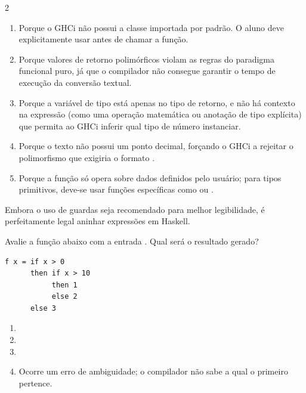 \documentclass[a4paper,10pt,brazil]{article}
\begin{document}
\begin{multicols}{2}
\begin{enumerate}
  \item Porque o GHCi não possui a classe  importada por padrão. O aluno deve explicitamente usar  antes de chamar a função.

  \item Porque valores de retorno polimórficos violam as regras do paradigma funcional puro, já que o compilador não consegue garantir o tempo de execução da conversão textual.

  \item Porque a variável de tipo  está apenas no tipo de retorno, e não há contexto na expressão (como uma operação matemática ou anotação de tipo explícita) que permita ao GHCi inferir qual tipo de número instanciar.

  \item Porque o texto  não possui um ponto decimal, forçando o GHCi a rejeitar o polimorfismo que exigiria o formato .

  \item Porque a função  só opera sobre dados definidos pelo usuário; para tipos primitivos, deve-se usar funções específicas como  ou .


\end{enumerate}

Embora o uso de guardas seja recomendado para melhor legibilidade, é perfeitamente legal aninhar expressões  em Haskell. 

Avalie a função abaixo com a entrada . Qual será o resultado gerado?
\begin{verbatim}
f x = if x > 0
      then if x > 10
           then 1
           else 2
      else 3
\end{verbatim}

\begin{enumerate}
  \item {}

  \item {}

  \item {}

  \item Ocorre um erro de ambiguidade; o compilador não sabe a qual  o primeiro  pertence.


\end{enumerate}
\end{multicols}
\end{document}
